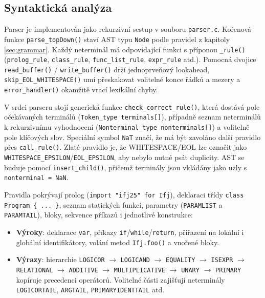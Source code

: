 \documentclass[a4paper,12pt]{article}
\begin{document}
\subsection{Syntaktická analýza}
Parser je implementován jako rekurzivní sestup v souboru \texttt{parser.c}. Kořenová funkce \texttt{parse\_topDown()} staví AST typu \texttt{Node} podle pravidel z kapitoly \ref{sec:grammar}. Každý neterminál má odpovídající funkci s příponou \texttt{\_rule()} (\texttt{prolog\_rule}, \texttt{class\_rule}, \texttt{func\_list\_rule}, \texttt{expr\_rule} atd.). Pomocná dvojice \texttt{read\_buffer()} / \texttt{write\_buffer()} drží jednoprveňový lookahead, \texttt{skip\_EOL\_WHITESPACE()} umí přeskakovat volitelné konce řádků a mezery a \texttt{error\_handler()} okamžitě vrací lexikální chyby.

V srdci parseru stojí generická funkce \texttt{check\_correct\_rule()}, která dostává pole očekávaných terminálů (\texttt{Token\_type terminals[]}), případně seznam neterminálů k rekurzivnímu vyhodnocení (\texttt{Nonterminal\_type nonterminals[]}) a volitelně pole klíčových slov. Speciální symbol \texttt{NaT} značí, že má být zavoláno další pravidlo přes \texttt{call\_rule()}. Zlaté pravidlo je, že WHITESPACE/EOL lze označit jako \texttt{WHITESPACE\_EPSILON}/\texttt{EOL\_EPSILON}, aby nebylo nutné psát duplicity. AST se buduje pomocí \texttt{insert\_child()}, přičemž terminály jsou vkládány jako uzly s \texttt{nonterminal = NaN}.

Pravidla pokrývají prolog (\texttt{import "ifj25" for Ifj}), deklaraci třídy \texttt{class Program \{ ... \}}, seznam statických funkcí, parametry (\texttt{PARAMLIST} a \texttt{PARAMTAIL}), bloky, sekvence příkazů i jednotlivé konstrukce:
\begin{itemize}
    \item \textbf{Výroky}: deklarace \texttt{var}, příkazy \texttt{if}/\texttt{while}/\texttt{return}, přiřazení na lokální i globální identifikátory, volání metod \texttt{Ifj.foo()} a vnořené bloky.
    \item \textbf{Výrazy}: hierarchie \texttt{LOGICOR} $\rightarrow$ \texttt{LOGICAND} $\rightarrow$ \texttt{EQUALITY} $\rightarrow$ \texttt{ISEXPR} $\rightarrow$ \texttt{RELATIONAL} $\rightarrow$ \texttt{ADDITIVE} $\rightarrow$ \texttt{MULTIPLICATIVE} $\rightarrow$ \texttt{UNARY} $\rightarrow$ \texttt{PRIMARY} kopíruje precedenci operátorů. Volitelné části zajišťují neterminály \texttt{LOGICORTAIL}, \texttt{ARGTAIL}, \texttt{PRIMARYIDENTTAIL} atd.
\end{itemize}
\end{document}
